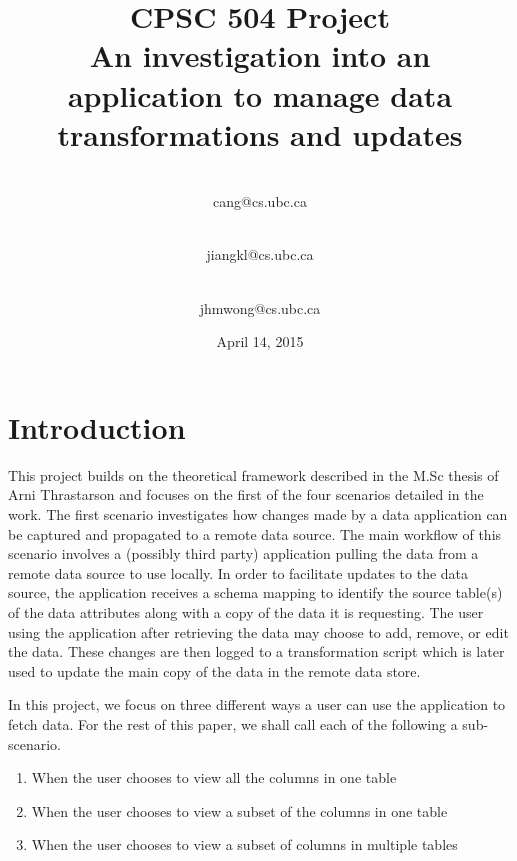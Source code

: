 \documentclass[12pt]{article}
\begin{document}
\begin{titlepage}
\title{\textbf{CPSC 504 Project\\\vspace{3 cm}\Huge{An investigation into an application to manage data transformations and updates}\vspace{2 cm}}}
\date{\vspace{2 cm} April 14, 2015}

\author{
 \\cang@cs.ubc.ca\\
  \and {}\\jiangkl@cs.ubc.ca\\
  \and {}\\jhmwong@cs.ubc.ca\\ 
}
\maketitle
\thispagestyle{empty}
\end{titlepage}

\newpage
\section{Introduction}
\label{sec:introduction}
This project builds on the theoretical framework described in the M.Sc thesis of Arni Thrastarson \cite{arniThesis} and focuses on the first of the four scenarios detailed in the work. The first scenario investigates how changes made by a data application can be captured and propagated to a remote data source. The main workflow of this scenario involves a (possibly third party) application pulling the data from a remote data source to use locally. In order to facilitate updates to the data source, the application receives a schema mapping to identify the source table(s) of the data attributes along with a copy of the data it is requesting. The user using the application after retrieving the data may choose to add, remove, or edit the data. These changes are then logged to a transformation script which is later used to update the main copy of the data in the remote data store.

In this project, we focus on three different ways a user can use the application to fetch data. For the rest of this paper, we shall call each of the following a sub-scenario. 
\begin{enumerate}
	\item {When the user chooses to view all the columns in one table}
	\item {When the user chooses to view a subset of the columns in one table}
	\item {When the user chooses to view a subset of columns in multiple tables}
\end{enumerate}
\end{document}
